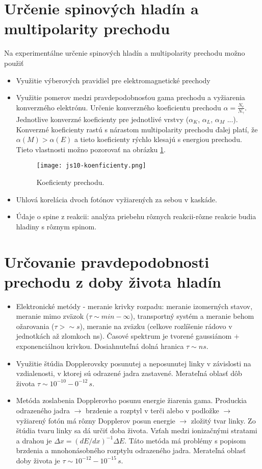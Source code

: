 \documentclass[../../main.tex]{subfiles}
\begin{document}
\section{Určenie spinových hladín a multipolarity prechodu}
Na experimentálne určenie spinových hladín a multipolarity prechodu možno použiť
\begin{itemize}
	\item Využitie výberových pravidiel pre elektromagnetické prechody
	\item Využitie pomerov medzi pravdepodobnosťou gama prechodu a vyžiarenia konverzného elektrónu. Určenie konverzného koeficientu prechodu $\alpha=\frac{N_e}{N_{\gamma}}$. Jednotlive konverzné koeficienty pre jednotlivé vrstvy ($\alpha_K$, $\alpha_L$, $\alpha_M$ ...). Konverzné koeficienty rastú s nárastom multipolarity prechodu ďalej platí, že $\alpha(M)>\alpha(E)$ a tieto koeficienty rýchlo klesajú s energiou prechodu. Tieto vlastnosti možno pozorovať na obrázku \ref{js10:koef}.
	\begin{figure}[!h]
	\centerline{\texttt{[image: js10-koenficienty.png]}}
	\caption{Koeficienty prechodu.}
	\label{js10:koef}
	\end{figure}
	\item Uhlová korelácia dvoch fotónov vyžiarených za sebou v kaskáde.
	\item Údaje o spine z reakcii: analýza priebehu rôznych reakcii-rôzne reakcie budia hladiny s rôznym spinom.
\end{itemize}
\section{Určovanie pravdepodobnosti prechodu z doby života hladín}
\begin{itemize}
	\item Elektronické metódy - meranie krivky rozpadu: meranie izomerných stavov, meranie mimo zväzok ($\tau \sim min-\infty$), transportný systém a meranie behom ožarovania ($\tau > \sim s$), meranie na zväzku (celkove rozlíšenie rádovo v jednotkách až zlomkoch ns). Časové spektrum je tvorené gaussiánom $+$ exponenciálnou krivkou. Dosiahnuteľná dolná hranica $\tau \sim ns$.
	\item Využitie štúdia Dopplerovsky posunutej a neposunutej linky v závislosti na vzdialenosti, v ktorej sú odrazené jadra zastavené. Merateľná oblasť dôb života $\tau \sim 10^{-10}- 0^{-12}\,s$.
	\item Metóda zoslabenia Dopplerovho posunu energie žiarenia gama. Produckia odrazeného jadra $\rightarrow$ brzdenie a rozptyl v terči alebo v podložke $\rightarrow$ vyžiarený fotón má rôzny Dopplerov posun energie $\rightarrow$ zložitý tvar linky. Zo štúdia tvaru linky sa dá určiť doba života. Vzťah medzi ionizačnými stratami a drahou je $\Delta x=(dE/dx)^{-1}\Delta E$. Táto metóda má problémy s popisom brzdenia a mnohonásobného rozptylu odrazeného jadra. Merateľná oblasť doby života je $\tau \sim 10^{-12}-10^{-15}\,s$.
\end{itemize}
\end{document}
